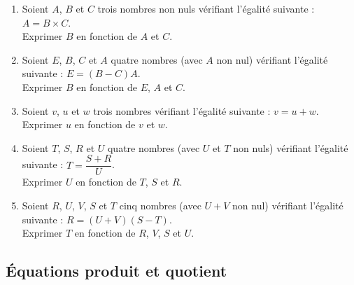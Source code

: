 {%
\begin{Exercice} %
\leavevmode\vspace{-\baselineskip}
\begin{enumerate}[itemsep=1em]
	\item \begin{minipage}[t]{\linewidth}Soient $A$, $B$ et $C$ trois nombres non nuls vérifiant l'égalité suivante :
  $A=B\times C$.\\
  Exprimer $B$ en fonction de $A$ et $C$.\end{minipage}
	\item \begin{minipage}[t]{\linewidth}Soient $E$, $B$, $C$ et $A$   quatre nombres (avec $A$ non nul) vérifiant l'égalité suivante :  $E=(B-C)A$.\\
  Exprimer $B$ en fonction de $E$, $A$ et  $C$.\end{minipage}
	\item \begin{minipage}[t]{\linewidth}Soient $v$, $u$ et $w$ trois nombres vérifiant l'égalité suivante :
             $v=u+w$.\\
            Exprimer $u$ en fonction de $v$ et $w$.\end{minipage}
	\item \begin{minipage}[t]{\linewidth}Soient $T$, $S$, $R$ et $U$   quatre nombres (avec $U$ et $T$  non nuls) vérifiant l'égalité suivante :  $T=\dfrac{S+R}{U}$.\\
  Exprimer $U$ en fonction de $T$, $S$ et  $R$.\end{minipage}
	\item \begin{minipage}[t]{\linewidth}Soient $R$, $U$, $V$, $S$ et $T$ cinq nombres (avec $U+V$ non nul) vérifiant l'égalité suivante : $R=(U+V)(S-T)$.\\
                Exprimer $T$ en fonction de $R$, $V$, $S$ et $U$.\end{minipage}
\end{enumerate}
\end{Exercice}

\subsection*{Équations produit et quotient}


}
